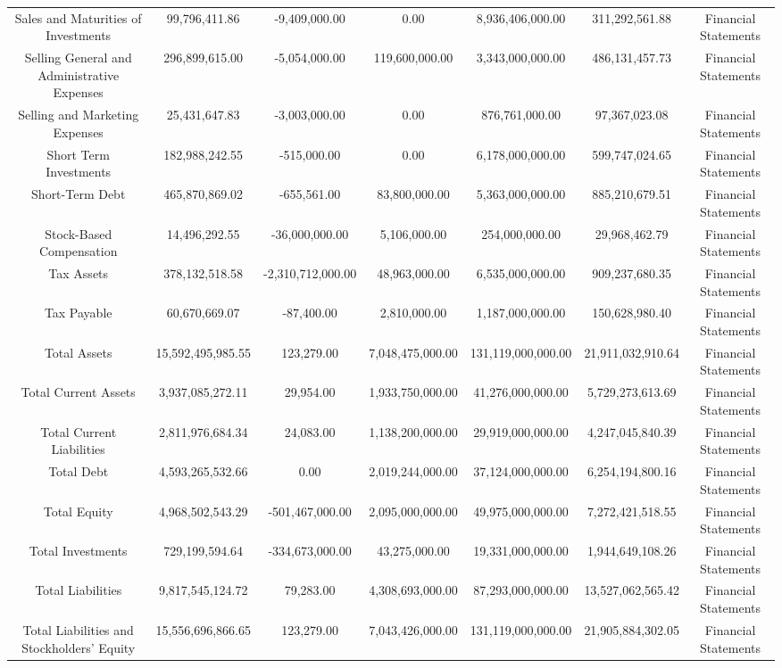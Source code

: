 \begin{longtable}{ccccccc}
Sales and Maturities of Investments & 99,796,411.86 & -9,409,000.00 & 0.00 & 8,936,406,000.00 & 311,292,561.88 & Financial Statements \\
Selling General and Administrative Expenses & 296,899,615.00 & -5,054,000.00 & 119,600,000.00 & 3,343,000,000.00 & 486,131,457.73 & Financial Statements \\
Selling and Marketing Expenses & 25,431,647.83 & -3,003,000.00 & 0.00 & 876,761,000.00 & 97,367,023.08 & Financial Statements \\
Short Term Investments & 182,988,242.55 & -515,000.00 & 0.00 & 6,178,000,000.00 & 599,747,024.65 & Financial Statements \\
Short-Term Debt & 465,870,869.02 & -655,561.00 & 83,800,000.00 & 5,363,000,000.00 & 885,210,679.51 & Financial Statements \\
Stock-Based Compensation & 14,496,292.55 & -36,000,000.00 & 5,106,000.00 & 254,000,000.00 & 29,968,462.79 & Financial Statements \\
Tax Assets & 378,132,518.58 & -2,310,712,000.00 & 48,963,000.00 & 6,535,000,000.00 & 909,237,680.35 & Financial Statements \\
Tax Payable & 60,670,669.07 & -87,400.00 & 2,810,000.00 & 1,187,000,000.00 & 150,628,980.40 & Financial Statements \\
Total Assets & 15,592,495,985.55 & 123,279.00 & 7,048,475,000.00 & 131,119,000,000.00 & 21,911,032,910.64 & Financial Statements \\
Total Current Assets & 3,937,085,272.11 & 29,954.00 & 1,933,750,000.00 & 41,276,000,000.00 & 5,729,273,613.69 & Financial Statements \\
Total Current Liabilities & 2,811,976,684.34 & 24,083.00 & 1,138,200,000.00 & 29,919,000,000.00 & 4,247,045,840.39 & Financial Statements \\
Total Debt & 4,593,265,532.66 & 0.00 & 2,019,244,000.00 & 37,124,000,000.00 & 6,254,194,800.16 & Financial Statements \\
Total Equity & 4,968,502,543.29 & -501,467,000.00 & 2,095,000,000.00 & 49,975,000,000.00 & 7,272,421,518.55 & Financial Statements \\
Total Investments & 729,199,594.64 & -334,673,000.00 & 43,275,000.00 & 19,331,000,000.00 & 1,944,649,108.26 & Financial Statements \\
Total Liabilities & 9,817,545,124.72 & 79,283.00 & 4,308,693,000.00 & 87,293,000,000.00 & 13,527,062,565.42 & Financial Statements \\
Total Liabilities and Stockholders' Equity & 15,556,696,866.65 & 123,279.00 & 7,043,426,000.00 & 131,119,000,000.00 & 21,905,884,302.05 & Financial Statements \\

\end{longtable}
